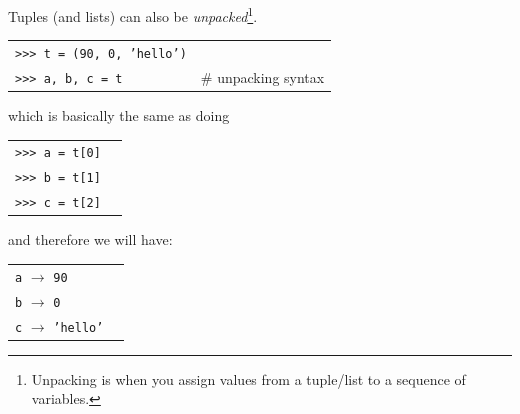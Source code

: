 \documentclass[t,handout,9pt]{beamer}
\begin{document}
\begin{frame}
\vfill
Tuples (and lists) can also be \textit{unpacked}\footnote{Unpacking is when you assign values from a tuple/list to a sequence of variables.}.
\vfill
\begin{table}[]
\begin{flushleft}
\begin{tabular}{ll}
\texttt{>{}>{}> t = (90, 0, 'hello')} & \\
\texttt{>{}>{}> a, b, c = t} &  \# unpacking syntax\\
\end{tabular}
\end{flushleft}
\end{table}
\vfill
which is basically the same as doing
\begin{table}[]
\begin{flushleft}
\begin{tabular}{ll}
\texttt{>{}>{}> a = t[0]} & \\
\texttt{>{}>{}> b = t[1]} & \\
\texttt{>{}>{}> c = t[2]} & \\
\end{tabular}
\end{flushleft}
\end{table}
\vfill
and therefore we will have:
\begin{table}[]
\begin{flushleft}
\begin{tabular}{ll}
\texttt{a} $\rightarrow$ \texttt{90} & \\
\texttt{b} $\rightarrow$ \texttt{0} & \\
\texttt{c} $\rightarrow$ \texttt{'hello'} & \\
\end{tabular}
\end{flushleft}
\end{table}
\vfill
\end{frame}
%
\end{document}
